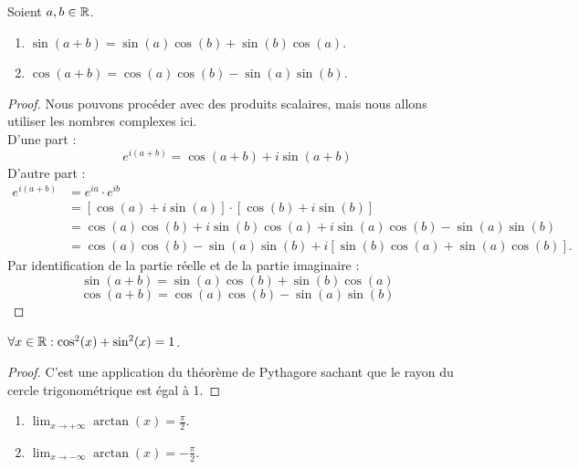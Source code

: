 \begin{proposition}
	Soient $a, b \in \mathbb{R}$.
        \begin{enumerate}
            \item $\sin(a + b) = \sin(a) \cos(b) + \sin(b) \cos(a)$.
            \item $\cos(a + b) = \cos(a) \cos(b) - \sin(a) \sin(b)$.
        \end{enumerate}
\end{proposition}

\begin{proof}
    Nous pouvons procéder avec des produits scalaires, mais nous allons utiliser les nombres complexes ici.
    \\
    D'une part :
    \[e^{i (a + b)} = \cos(a + b) + i\sin(a + b)\]
    D'autre part :
    \begin{align*}
        e^{i (a + b)} &= e^{ia} \cdot e^{ib} \\
        &= [\cos(a) + i \sin(a)] \cdot [\cos(b) + i \sin(b)] \\
        &= \cos(a) \cos(b) + i\sin(b)\cos(a) + i\sin(a)\cos(b) - \sin(a)\sin(b) \\
        &= \cos(a)\cos(b) - \sin(a)\sin(b) + i [\sin(b)\cos(a) + \sin(a) \cos(b)].
    \end{align*}
    Par identification de la partie réelle et de la partie imaginaire :
    \[ \sin(a + b) = \sin(a) \cos(b) + \sin(b) \cos(a) \]
	\[ \cos(a + b) = \cos(a) \cos(b) - \sin(a) \sin(b) \]
\end{proof}

\begin{proposition}
    $\forall x \in \mathbb{R} : \cos^2(x) + \sin^2(x) = 1$.
\end{proposition}

\begin{proof}
    C'est une application du théorème de Pythagore sachant que le rayon du cercle trigonométrique est égal à 1.
\end{proof}

\begin{proposition}
	
    \begin{enumerate}
        \item $\lim_{x \to +\infty} \arctan(x) = \frac{\pi}{2}$.
        \item $\lim_{x \to -\infty} \arctan(x) = -\frac{\pi}{2}$.
    \end{enumerate}
\end{proposition}

